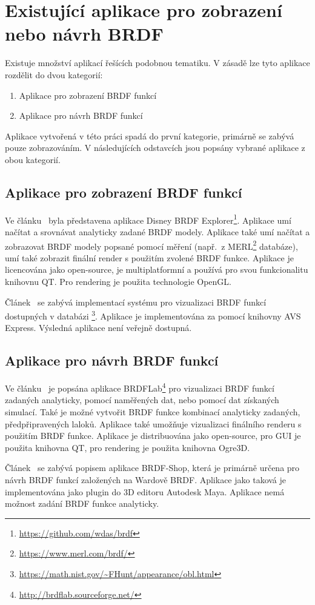 \documentclass[czech,master]{diploma}
\begin{document}
\section{Existující aplikace pro zobrazení nebo návrh BRDF}
Existuje množství aplikací řešících podobnou tematiku. V zásadě lze tyto aplikace rozdělit do dvou kategorií:
\begin{enumerate}
  \item Aplikace pro zobrazení BRDF funkcí
  \item Aplikace pro návrh BRDF funkcí
\end{enumerate}
Aplikace vytvořená v této práci spadá do první kategorie, primárně se zabývá pouze zobrazováním. V následujících odstavcích jsou popsány vybrané aplikace z obou kategorií.

\subsection{Aplikace pro zobrazení BRDF funkcí}
Ve článku~\cite{DisneyBRDF} byla představena aplikace Disney BRDF Explorer\footnote{\url{https://github.com/wdas/brdf}}. Aplikace umí načítat a srovnávat analyticky zadané BRDF modely. Aplikace také umí načítat a zobrazovat BRDF modely popsané pomocí měření (např.\ z MERL\footnote{\url{https://www.merl.com/brdf/}} databáze), umí také zobrazit finální render s použitím zvolené BRDF funkce. Aplikace je licencována jako open-source, je multiplatformní a používá pro svou funkcionalitu knihovnu QT\@. Pro rendering je použita technologie OpenGL\@.\par
Článek~\cite{brdfviz} se zabývá implementací systému pro vizualizaci BRDF funkcí dostupných v databázi \footnote{\url{https://math.nist.gov/~FHunt/appearance/obl.html}}. Aplikace je implementována za pomocí knihovny AVS Express. Výsledná aplikace není veřejně dostupná.

\subsection{Aplikace pro návrh BRDF funkcí}
Ve článku~\cite{Fors2009BRDFLabAG} je popsána aplikace BRDFLab\footnote{\url{http://brdflab.sourceforge.net/}} pro vizualizaci BRDF funkcí zadaných analyticky, pomocí naměřených dat, nebo pomocí dat získaných simulací. Také je možné vytvořit BRDF funkce kombinací analyticky zadaných, předpřipravených laloků. Aplikace také umožňuje vizualizaci finálního renderu s použitím BRDF funkce. Aplikace je distribuována jako open-source, pro GUI je použita knihovna QT, pro rendering je použita knihovna Ogre3D.
\par
Článek~\cite{brdfshop} se zabývá popisem aplikace BRDF-Shop, která je primárně určena pro návrh BRDF funkcí založených na Wardově BRDF\@. Aplikace jako taková je implementována jako plugin do 3D editoru Autodesk Maya. Aplikace nemá možnost zadání BRDF funkce analyticky.
\end{document}
